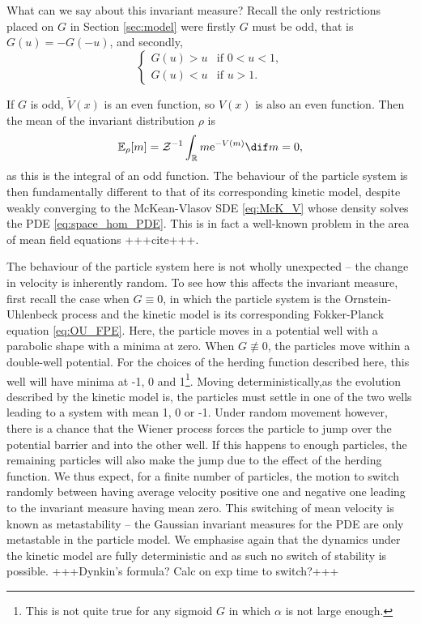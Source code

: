 \documentclass[11pt, a4paper, draft]{article}
\begin{document}
        What can we say about this invariant measure? Recall the only restrictions placed on $G$ in Section \ref{sec:model} were firstly $G$ must be odd, that is $G(u)=-G(-u)$, and secondly,
        \[
            \begin{cases}
            G(u)>u & \text{if } 0<u<1,\\ 
            G(u)<u &  \text{if } u>1.
            \end{cases}
        \]
         
        If $G$ is odd, $\tilde{V}(x)$ is an even function, so $V(x)$ is also an even function. Then the mean of the invariant distribution $\rho$ is
        \[
            \mathbb{E}_{\rho}[m] = \mathcal{Z}^{-1}\int_{\mathbb{R}} m \mathrm{e}^{-V(m)}\dif m = 0,
        \]
        as this is the integral of an odd function. The behaviour of the particle system is then fundamentally different to that of its corresponding kinetic model, despite weakly converging to the McKean-Vlasov SDE \eqref{eq:McK_V} whose density solves the PDE \eqref{eq:space_hom_PDE}. This is in fact a well-known problem in the area of mean field equations +++cite+++. 
        
    The behaviour of the particle system here is not wholly unexpected -- the change in velocity is inherently random. To see how this affects the invariant measure, first recall the case when $G\equiv 0$, in which the particle system is the Ornstein-Uhlenbeck process and the kinetic model is its corresponding Fokker-Planck equation \eqref{eq:OU_FPE}. Here, the particle moves in a potential well with a parabolic shape with a minima at zero. When $G\not\equiv 0$, the particles move within a double-well potential. For the choices of the herding function described here, this well will have minima at -1, 0 and 1\footnote{This is not quite true for any sigmoid $G$ in which $\alpha$ is not large enough.}. Moving deterministically,as the evolution described by the kinetic model is, the particles must settle in one of the two wells leading to a system with mean 1, 0 or -1. Under random movement however, there is a chance that the Wiener process forces the particle to jump over the potential barrier and into the other well. If this happens to enough particles, the remaining particles will also make the jump due to the effect of the herding function. We thus expect, for a finite number of particles, the motion to switch randomly between having average velocity positive one and negative one leading to the invariant measure having mean zero. This switching of mean velocity is known as metastability -- the Gaussian invariant measures for the PDE are only metastable in the particle model. We emphasise again that the dynamics under the kinetic model are fully deterministic and as such no switch of stability is possible. +++Dynkin's formula? Calc on exp time to switch?+++
        
\end{document}
